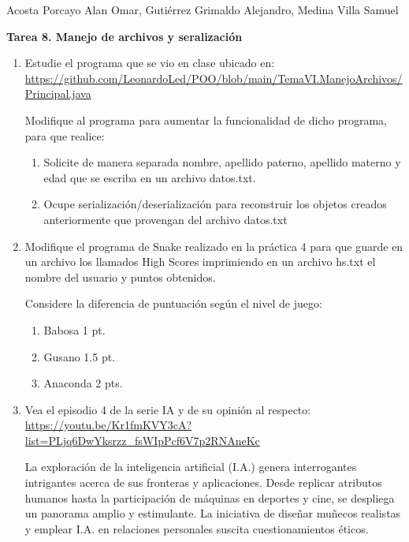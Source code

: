 \documentclass[12pt]{article}
\newcommand{\linejump}{\hfill \break}
\begin{document}
  \begin{center}
    Acosta Porcayo Alan Omar, Gutiérrez Grimaldo Alejandro, Medina Villa Samuel

    \linejump
    \LARGE \textbf{Tarea 8. Manejo de archivos y seralización}
  \end{center}
  
  \linejump
  \begin{enumerate}
    \item Estudie el programa que se vio en clase ubicado en: \url{https://github.com/LeonardoLed/POO/blob/main/TemaVI.ManejoArchivos/Principal.java}
    
    Modifique al programa para aumentar la funcionalidad de dicho programa, para que realice:
    \begin{enumerate}[label=\alph*)]
      \item Solicite de manera separada nombre, apellido paterno, apellido materno y edad que se escriba en un archivo datos.txt.
      \item Ocupe serialización/deserialización para reconstruir los objetos creados anteriormente que provengan del archivo datos.txt
    \end{enumerate}


    \item Modifique el programa de Snake realizado en la práctica 4 para que guarde en un archivo los llamados High Scores imprimiendo en un archivo hs.txt el nombre del usuario y puntos obtenidos.
    
    Considere la diferencia de puntuación según el nivel de juego:
    \begin{enumerate}[label=\alph*.]
      \item Babosa 1 pt.
      \item Gusano 1.5 pt.
      \item Anaconda 2 pts.
    \end{enumerate}

    
    \item Vea el episodio 4 de la serie IA y de su opinión al respecto: \url{https://youtu.be/Kr1fmKVY3cA?list=PLjq6DwYksrzz_fsWIpPcf6V7p2RNAneKc}
    
    La exploración de la inteligencia artificial (I.A.) genera interrogantes intrigantes acerca de sus fronteras y aplicaciones. Desde replicar atributos humanos hasta la participación de máquinas en deportes y cine, se despliega un panorama amplio y estimulante. La iniciativa de diseñar muñecos realistas y emplear I.A. en relaciones personales suscita cuestionamientos éticos.


\end{enumerate}
\end{document}
